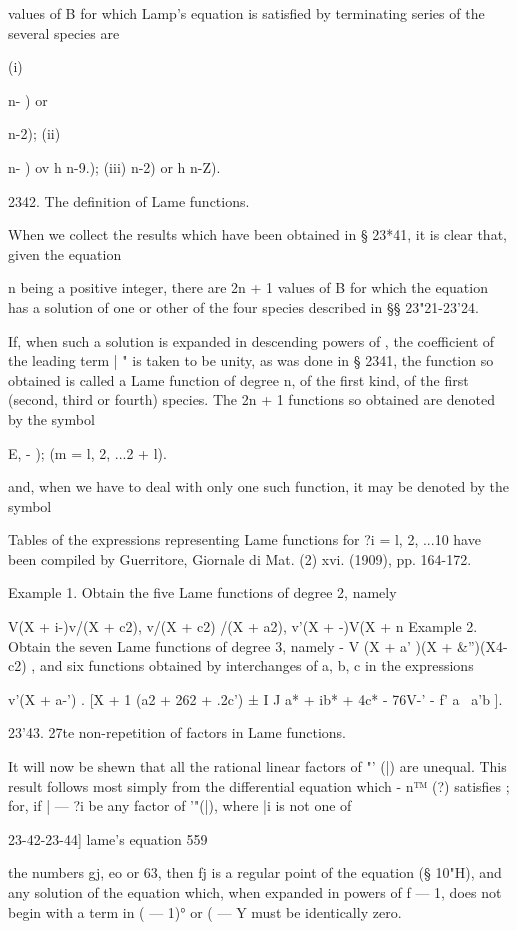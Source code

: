 {{{{values of B for which Lamp's equation is satisfied by terminating
series of the several species are

(i) \ \ {n- ) or \ \ {n-2); (ii) \ \ {n- ) ov h n-9.); (iii) n-2) or h
n-Z).

2342. The definition of Lame functions.

When we collect the results which have been obtained in § 23*41, it is
clear that, given the equation

n being a positive integer, there are 2n + 1 values of B for which the
equation has a solution of one or other of the four species described
in §§ 23"21-23'24.

If, when such a solution is expanded in descending powers of , the
coefficient of the leading term | " is taken to be unity, as was done
in § 2341, the function so obtained is called a Lame function of
degree n, of the first kind, of the first (second, third or fourth)
species. The 2n + 1 functions so obtained are denoted by the symbol

E, - ); (m = l, 2, ...2 + l).

and, when we have to deal with only one such function, it may be
denoted by the symbol

Tables of the expressions representing Lame functions for ?i = l, 2,
...10 have been compiled by Guerritore, Giornale di Mat. (2) xvi.
(1909), pp. 164-172.

Example 1. Obtain the five Lame functions of degree 2, namely

V(X + i-)v/(X + c2), v/(X + c2) /(X + a2), v'(X + -)V(X + n Example 2.
Obtain the seven Lame functions of degree 3, namely - V (X + a' )(X +
\&'')(X4-c2) , and six functions obtained by interchanges of a, b, c
in the expressions

v'(X + a-') . [X + 1 (a2 + 262 + .2c') ± I J a* + ib* + 4c* - 76V-' -
f' a \ a'b ].

23'43. 27te non-repetition of factors in Lame functions.

It will now be shewn that all the rational linear factors of "' (|)
are unequal. This result follows most simply from the differential
equation which - n™ (?) satisfies ; for, if | — ?i be any factor of
'"(|), where |i is not one of



23-42-23-44] lame's equation 559

the numbers gj, eo or 63, then fj is a regular point of the equation
(§ 10"H), and any solution of the equation which, when expanded in
powers of f — 1, does not begin with a term in ( — 1)° or ( — Y must
be identically zero.

}}}}}}}
